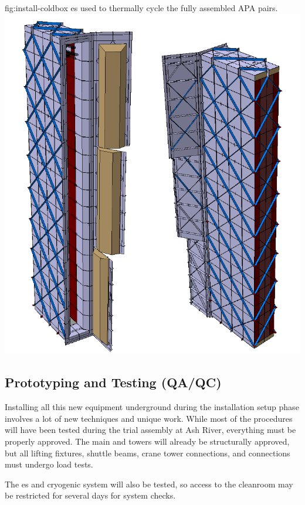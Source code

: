 \begin{dunefigure}{fig:install-coldbox}
  {\coldbox{}es used to thermally cycle the fully assembled APA pairs. }
\includegraphics[width=.5\textwidth]{graphics/install-coldbox.pdf}
\end{dunefigure}





\subsection{Prototyping and Testing (QA/QC)}
\label{sec:fdsp-tc-infr-qaqc}


Installing all this new equipment underground during the installation setup phase involves a lot of new techniques  and unique work. While most of the procedures will have been tested during the trial assembly at Ash River, everything must be properly approved. The main  and  towers will already be structurally approved, but all lifting fixtures, shuttle beams, crane tower connections, and \coldbox connections must undergo load tests. 


The \coldbox{}es and cryogenic system will also be tested, so access to the cleanroom  may be restricted for several days for system checks.

